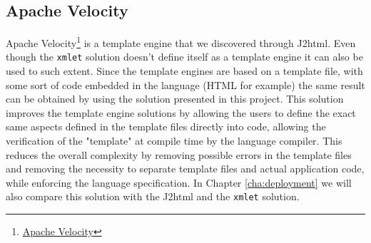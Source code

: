 \iffalse
\noindent
The solutions that existed prior to this dissertation were already aiming to solve some of those handicaps. We had two different solutions, J2html\footnote{\href{https://j2html.com/}{J2html}}, which is a solution that removes the necessity of text files to define the templates and using some Java instructions to replace the syntax provided by template engines. J2html however did not guaranteed that the language rules were being followed while creating the documents and is only designed to work for \ac{HTML}. The second solution, HtmlFlow\footnote{\href{https://github.com/xmlet/HtmlFlow}{HtmlFlow}} removed the necessity of text files to define the templates and also used the Java syntax to manipulate the templates. HtmlFlow had already implemented some restrictions of the \ac{HTML} language manually but only supported a few core \ac{HTML} elements, since recreating all the \ac{HTML} elements and their restrictions manually is very time consuming. Both of theses solutions had also problems regarding maintainability, if any change was needed it had to be performed manually. 

\noindent
While both these solutions were a step in the right direction some aspects became clear, we needed to create a process that could automatically create a fluent \ac{API} based on the set of rules of a given language. The generated \ac{API}s should take advantage of the Java language compiler to enforce the language restrictions and use its syntax to generate templates without having the need to create templates in text files.
\fi

\subsection{Apache Velocity} %
\label{sec:apachevelocity}

Apache Velocity\footnote{\href{http://velocity.apache.org/}{Apache Velocity}} is a template engine that we discovered through J2html. Even though the  \texttt{xmlet} solution doesn't define itself as a template engine it can also be used to such extent. Since the template engines are based on a template file, with some sort of code embedded in the language (\ac{HTML} for example) the same result can be obtained by using the solution presented in this project. This solution improves the template engine solutions by allowing the users to define the exact same aspects defined in the template files directly into code, allowing the verification of the "template" at compile time by the language compiler. This reduces the overall complexity by removing possible errors in the template files and removing the necessity to separate template files and actual application code, while enforcing the language specification. In Chapter \ref{cha:deployment} we will also compare this solution with the J2html and the \texttt{xmlet} solution.






